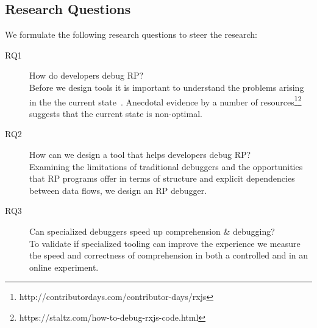 \subsection{Research Questions}
We formulate the following research questions to steer the research: 

\begin{description}
\item[RQ1] How do developers debug RP? \\
Before we design tools it is important to understand the problems arising in the the current state~\cite{singer2010examination}. Anecdotal evidence by a number of resources\footnote{http://contributordays.com/contributor-days/rxjs}\footnote{https://staltz.com/how-to-debug-rxjs-code.html}
suggests that the current state is non-optimal.

%

\item[RQ2] How can we design a tool that helps developers debug RP? \\
Examining the limitations of traditional debuggers and the opportunities that RP programs offer in terms of structure and explicit dependencies between data flows, we design an RP debugger.


\item[RQ3] Can specialized debuggers speed up comprehension \& debugging? \\
To validate if specialized tooling can improve the experience we measure the speed and correctness of comprehension in both a controlled and in an online experiment.

\end{description}
